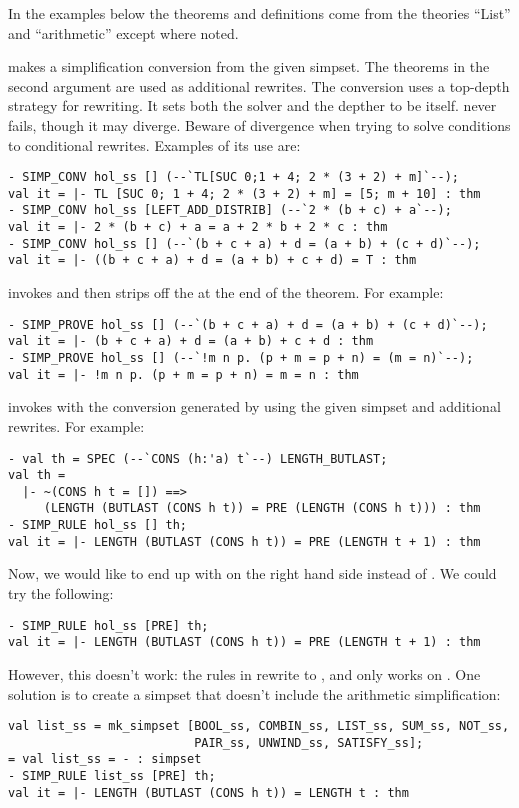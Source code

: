 In the examples below the theorems and definitions come from the
theories ``List'' and ``arithmetic'' except where noted.

 makes a simplification conversion from the given
simpset.  The theorems in the second argument are used as additional
rewrites. The conversion uses a top-depth strategy for rewriting. It
sets both the solver and the depther to be  itself.
 never fails, though it may diverge.  Beware of
divergence when trying to solve conditions to conditional rewrites.
Examples of its use are:
\begin{verbatim}
- SIMP_CONV hol_ss [] (--`TL[SUC 0;1 + 4; 2 * (3 + 2) + m]`--);
val it = |- TL [SUC 0; 1 + 4; 2 * (3 + 2) + m] = [5; m + 10] : thm
- SIMP_CONV hol_ss [LEFT_ADD_DISTRIB] (--`2 * (b + c) + a`--);
val it = |- 2 * (b + c) + a = a + 2 * b + 2 * c : thm
- SIMP_CONV hol_ss [] (--`(b + c + a) + d = (a + b) + (c + d)`--);
val it = |- ((b + c + a) + d = (a + b) + c + d) = T : thm
\end{verbatim}

 invokes  and then strips off the
 at the end of the theorem. For example:
\begin{verbatim}
- SIMP_PROVE hol_ss [] (--`(b + c + a) + d = (a + b) + (c + d)`--);
val it = |- (b + c + a) + d = (a + b) + c + d : thm
- SIMP_PROVE hol_ss [] (--`!m n p. (p + m = p + n) = (m = n)`--);
val it = |- !m n p. (p + m = p + n) = m = n : thm
\end{verbatim}

 invokes  with the conversion generated
by  using the given simpset and additional rewrites. For
example:
\begin{verbatim}
- val th = SPEC (--`CONS (h:'a) t`--) LENGTH_BUTLAST;
val th =
  |- ~(CONS h t = []) ==>
     (LENGTH (BUTLAST (CONS h t)) = PRE (LENGTH (CONS h t))) : thm
- SIMP_RULE hol_ss [] th;
val it = |- LENGTH (BUTLAST (CONS h t)) = PRE (LENGTH t + 1) : thm
\end{verbatim}
Now, we would like to end up with  on the right hand side
instead of . We could try the following:
\begin{verbatim}
- SIMP_RULE hol_ss [PRE] th;
val it = |- LENGTH (BUTLAST (CONS h t)) = PRE (LENGTH t + 1) : thm
\end{verbatim}
However, this doesn't work: the rules in  rewrite  to
, and  only works on . One solution is to
create a simpset that doesn't include the arithmetic simplification:
\begin{verbatim}
val list_ss = mk_simpset [BOOL_ss, COMBIN_ss, LIST_ss, SUM_ss, NOT_ss,
                          PAIR_ss, UNWIND_ss, SATISFY_ss];
= val list_ss = - : simpset
- SIMP_RULE list_ss [PRE] th;
val it = |- LENGTH (BUTLAST (CONS h t)) = LENGTH t : thm
\end{verbatim}

